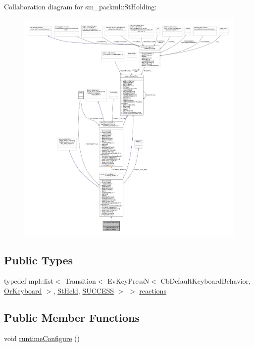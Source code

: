 Collaboration diagram for sm\+\_\+packml\+:\+:St\+Holding\+:
\nopagebreak
\begin{figure}[H]
\begin{center}
\leavevmode
\includegraphics[width=350pt]{structsm__packml_1_1StHolding__coll__graph}
\end{center}
\end{figure}
\subsection*{Public Types}
\begin{DoxyCompactItemize}
\item 
typedef mpl\+::list$<$ Transition$<$ Ev\+Key\+PressN$<$ Cb\+Default\+Keyboard\+Behavior, \hyperlink{classsm__packml_1_1OrKeyboard}{Or\+Keyboard} $>$, \hyperlink{structsm__packml_1_1StHeld}{St\+Held}, \hyperlink{classSUCCESS}{S\+U\+C\+C\+E\+SS} $>$ $>$ \hyperlink{structsm__packml_1_1StHolding_af6f29cea0ce7bbcc1b4b9faf61809791}{reactions}
\end{DoxyCompactItemize}
\subsection*{Public Member Functions}
\begin{DoxyCompactItemize}
\item 
void \hyperlink{structsm__packml_1_1StHolding_a3f27c013788233885fcd2566ff679877}{runtime\+Configure} ()
\end{DoxyCompactItemize}
